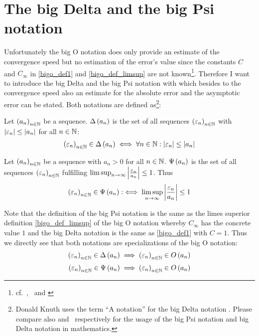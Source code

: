\section{The big Delta and the big Psi notation}
Unfortunately the big O notation does only provide an estimate of the convergence speed but no estimation of the error's value since the constants $C$ and $C_\infty$ in \eqref{bigo_def1} and \eqref{bigo_def_limsup} are not known\footnote{cf.~\cite[p.~444]{graham},~\cite{hurkyl_bigo} and \cite{templatetypedef_bigo}}. Therefore I want to introduce the big Delta and the big Psi notation with which besides to the convergence speed also an estimate for the absolute error and the asymptotic error can be stated. Both notations are defined as\footnote{Donald Knuth uses the term ``A notation'' for the big Delta notation \cite{anotation}. Please compare also \cite{tampis_bigpsi} and~\cite{tampis_bigabs} respectively for the usage of the big Psi notation and big Delta notation in mathematics.}:

\begin{definition}
  Let $\left({a_n}\right)_{{n}\in\mathbb N}$ be a sequence. $\Delta\left( {a_n} \right)$ is the set of all sequences $\left({\varepsilon_n}\right)_{{n}\in\mathbb N}$ with $\left|{\varepsilon_n}\right| \le \left|{a_n}\right|$ for all $n\in\mathbb N$:
  \begin{align}
    \left({\varepsilon_n}\right)_{{n}\in\mathbb N} \in \Delta\left( {a_n} \right) \iff \forall n\in\mathbb N: \left|{\varepsilon_n}\right| \le \left|{a_n}\right|
  \end{align}
\end{definition}

\begin{definition}
  Let $\left({a_n}\right)_{{n}\in\mathbb N}$ be a sequence with $a_n > 0$ for all $n\in\mathbb N$. $\Psi\left( {a_n} \right)$ is the set of all sequences $\left({\varepsilon_n}\right)_{{n}\in\mathbb N}$ fulfilling $\limsup_{n\to\infty} \left|{\frac{\varepsilon_n}{a_n}}\right| \le 1$. Thus
  \begin{align}
    \left({\varepsilon_n}\right)_{{n}\in\mathbb N} \in \Psi\left( {a_n} \right) :\iff \limsup_{n\to\infty} \left|{\frac{\varepsilon_n}{a_n}}\right| \le 1
  \end{align}
\end{definition}

Note that the definition of the big Psi notation is the same as the limes superior definition \eqref{bigo_def_limsup} of the big O notation whereby $C_\infty$ has the concrete value $1$ and the big Delta notation is the same as \eqref{bigo_def1} with $C=1$. Thus we directly see that both notations are specializations of the big O notation:
\begin{align}
  \seq{\epsilon_n} \in \bigabs{a_n} & \implies \seq{\epsilon_n} \in \bigo{a_n} \nl
  \seq{\epsilon_n} \in \bigpsi{a_n} & \implies \seq{\epsilon_n} \in \bigo{a_n}
\end{align}

